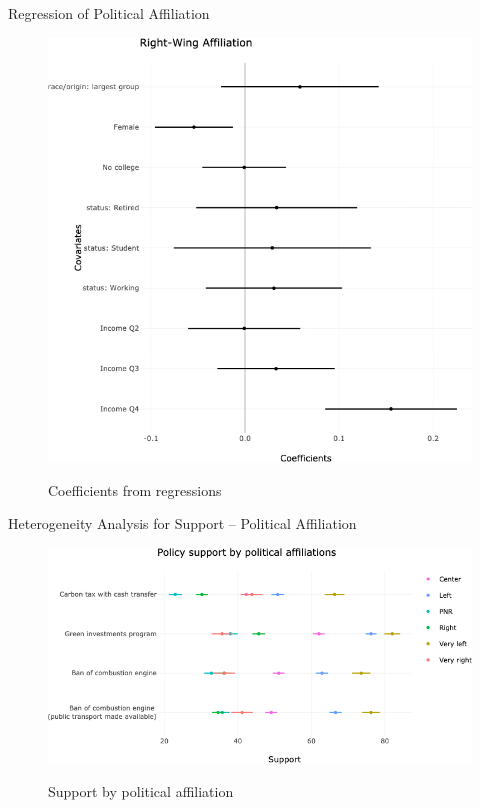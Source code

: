 \documentclass[aspectratio=169,9pt,dvipsnames]{beamer}
\begin{document}
\begin{frame}{Regression of Political Affiliation}%
\vspace{-.5cm}
\begin{figure}[h!]
\caption{Coefficients from regressions}
\includegraphics[width=.5\textwidth]{../figures/DK/coef_Right_DK.png} \\
\end{figure}
\end{frame}

\begin{frame}{Heterogeneity Analysis for Support -- Political Affiliation}%
\vspace{-.5cm}
\begin{figure}[h!]
\caption{Support by political affiliation}
\includegraphics[width=.5\textwidth]{../figures/DK/support_by_political_DK.png} \\
\end{figure}
\end{frame}
\end{document}
